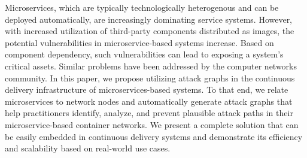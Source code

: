 
Microservices, which are typically technologically heterogenous and can be deployed automatically, are increasingly dominating service systems. However, with increased utilization of third-party components distributed as images, the potential vulnerabilities in microservice-based systems increase. Based on component dependency, such vulnerabilities can lead to exposing a system's critical assets. Similar problems have been addressed by the computer networks community. In this paper, we propose utilizing attack graphs in the continuous delivery infrastructure of microservices-based systems.  To that end, we relate microservices to network nodes and automatically generate attack graphs that help practitioners identify, analyze, and prevent plausible attack paths in their microservice-based container networks. We present a complete solution that can be easily embedded in continuous delivery systems and demonstrate its efficiency and scalability based on real-world use cases. 
